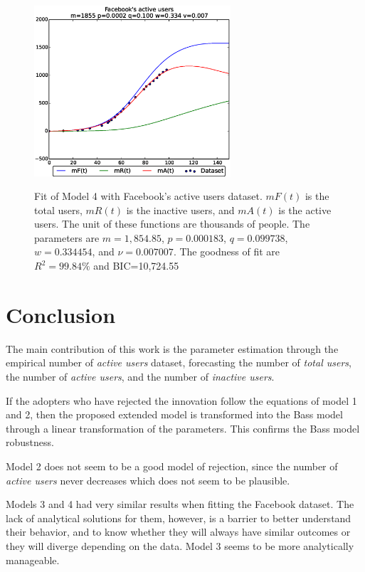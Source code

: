 \begin{figure}
	\centering
	{\includegraphics*[scale=0.9,width=0.65\textwidth]{images03/fb-model4-1.eps}}
	\caption{Fit of Model 4 with Facebook's active users dataset.\label{fig:model4fit}
		{$mF(t)$ is the total users, $mR(t)$ is the inactive users, and $mA(t)$ is the active users. The unit of these functions are thousands of people. The parameters are $m=1,854.85$, $p=0.000183$, $q=0.099738$, $w=0.334454$, and $\nu=0.007007$. The goodness of fit are $R^2=99.84\%$ and BIC=10,724.55}}
\end{figure}


\chapter{Conclusion}

The main contribution of this work is the parameter estimation through the empirical number of \textit{active users} dataset, forecasting the number of \textit{total users}, the number of \textit{active users}, and the number of \textit{inactive users}.

If the adopters who have rejected the innovation follow the equations of model 1 and 2, then the proposed extended model is transformed into the Bass model through a linear transformation of the parameters. This confirms the Bass model robustness.

Model 2 does not seem to be a good model of rejection, since the number of \textit{active users} never decreases which does not seem to be plausible.

Models 3 and 4 had very similar results when fitting the Facebook dataset. The lack of analytical solutions for them, however, is a barrier to better understand their behavior, and to know whether they will always have similar outcomes or they will diverge depending on the data. Model 3 seems to be more analytically manageable.

